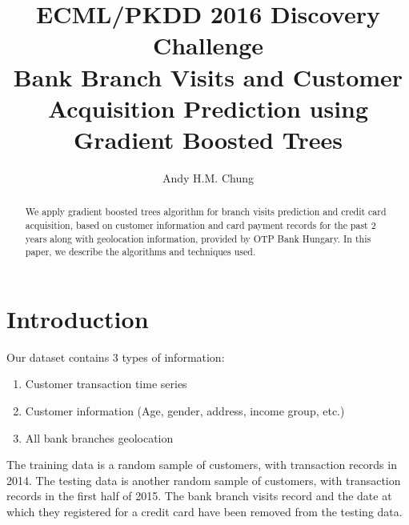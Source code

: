 \documentclass[a4paper]{llncs}
\begin{document}


\title{ECML/PKDD 2016 Discovery Challenge \\ Bank Branch Visits and Customer Acquisition Prediction using Gradient Boosted Trees}

\author{
    Andy H.M. Chung
}


\maketitle

\begin{abstract}
We apply gradient boosted trees algorithm for branch visits prediction and credit card acquisition,
 based on customer information and card payment records for the past 2 years along with geolocation information,
 provided by OTP Bank Hungary. In this paper, we describe the algorithms and techniques used.
\end{abstract}


\section{Introduction}
Our dataset contains 3 types of information:

\begin{enumerate}
\item Customer transaction time series
\item Customer information (Age, gender, address, income group, etc.)
\item All bank branches geolocation
\end{enumerate}

The training data is a random sample of customers, with transaction records in 2014.
 The testing data is another random sample of customers, with transaction records in the first half of 2015.
 The bank branch visits record and the date at which they registered for a credit card have been removed from the testing data.
\end{document}
